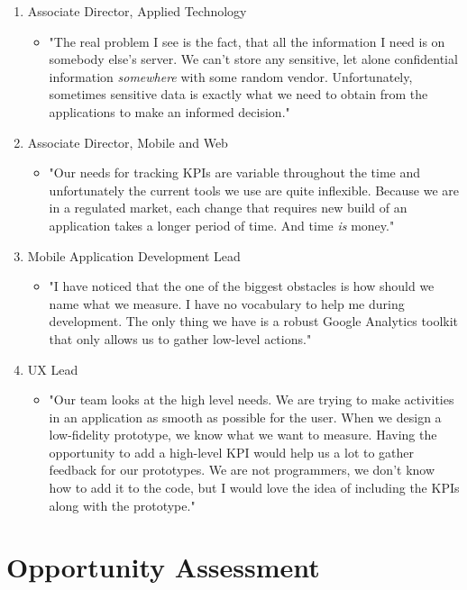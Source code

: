\begin{enumerate}
		\item Associate Director, Applied Technology
		\begin{itemize}
				\item[] "The real problem I see is the fact, that all the information I need is on somebody else's server. We can't store any sensitive, let alone confidential information \emph{somewhere} with some random vendor. Unfortunately, sometimes sensitive data is exactly what we need to obtain from the applications to make an informed decision."
		\end{itemize}	

		\item Associate Director, Mobile and Web
		\begin{itemize}
				\item[] "Our needs for tracking KPIs are variable throughout the time and unfortunately the current tools we use are quite inflexible. Because we are in a regulated market, each change that requires new build of an application takes a longer period of time. And time \emph{is} money."
		\end{itemize}				
		
		\item Mobile Application Development Lead
		\begin{itemize}
				\item[] "I have noticed that the one of the biggest obstacles is how should we name what we measure. I have no vocabulary to help me during development. The only thing we have is a robust Google Analytics toolkit that only allows us to gather low-level actions."
		\end{itemize}
		
		\item UX Lead
		\begin{itemize}
				\item[] "Our team looks at the high level needs. We are trying to make activities in an application as smooth as possible for the user. When we design a low-fidelity prototype, we know what we want to measure. Having the opportunity to add a high-level KPI would help us a lot to gather feedback for our prototypes. We are not programmers, we don't know how to add it to the code, but I would love the idea of including the KPIs along with the prototype."
		\end{itemize}
\end{enumerate}


\section{Opportunity Assessment}

